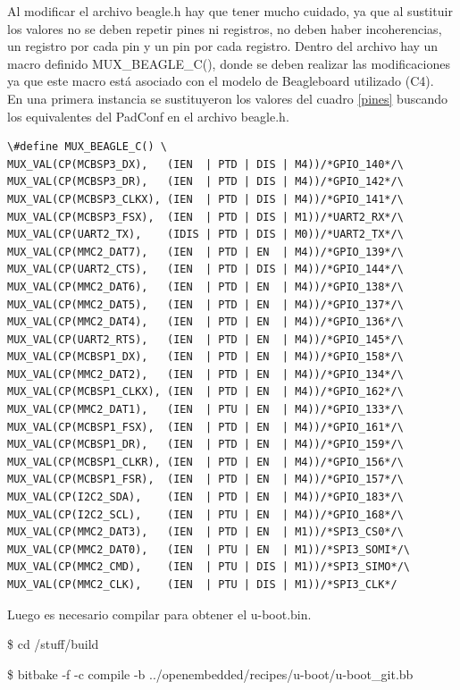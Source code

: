 Al modificar el archivo beagle.h hay que tener mucho cuidado, ya que al sustituir los valores no se deben repetir pines ni registros, no deben haber incoherencias, un registro por cada pin y un pin por cada registro. 
Dentro del archivo hay un macro definido MUX\_BEAGLE\_C(), donde se deben realizar las modificaciones ya que este macro está asociado con el modelo de Beagleboard utilizado (C4).\\
En una primera instancia se sustituyeron los valores del cuadro \ref{pines} buscando los equivalentes del 
PadConf en el archivo beagle.h. 


\begin{verbatim}
\#define MUX_BEAGLE_C() \
MUX_VAL(CP(MCBSP3_DX),   (IEN  | PTD | DIS | M4))/*GPIO_140*/\
MUX_VAL(CP(MCBSP3_DR),   (IEN  | PTD | DIS | M4))/*GPIO_142*/\
MUX_VAL(CP(MCBSP3_CLKX), (IEN  | PTD | DIS | M4))/*GPIO_141*/\
MUX_VAL(CP(MCBSP3_FSX),  (IEN  | PTD | DIS | M1))/*UART2_RX*/\
MUX_VAL(CP(UART2_TX),    (IDIS | PTD | DIS | M0))/*UART2_TX*/\
MUX_VAL(CP(MMC2_DAT7),   (IEN  | PTD | EN  | M4))/*GPIO_139*/\
MUX_VAL(CP(UART2_CTS),   (IEN  | PTD | DIS | M4))/*GPIO_144*/\
MUX_VAL(CP(MMC2_DAT6),   (IEN  | PTD | EN  | M4))/*GPIO_138*/\
MUX_VAL(CP(MMC2_DAT5),   (IEN  | PTD | EN  | M4))/*GPIO_137*/\
MUX_VAL(CP(MMC2_DAT4),   (IEN  | PTD | EN  | M4))/*GPIO_136*/\
MUX_VAL(CP(UART2_RTS),   (IEN  | PTD | EN  | M4))/*GPIO_145*/\
MUX_VAL(CP(MCBSP1_DX),   (IEN  | PTD | EN  | M4))/*GPIO_158*/\
MUX_VAL(CP(MMC2_DAT2),   (IEN  | PTD | EN  | M4))/*GPIO_134*/\
MUX_VAL(CP(MCBSP1_CLKX), (IEN  | PTD | EN  | M4))/*GPIO_162*/\
MUX_VAL(CP(MMC2_DAT1),   (IEN  | PTU | EN  | M4))/*GPIO_133*/\
MUX_VAL(CP(MCBSP1_FSX),  (IEN  | PTD | EN  | M4))/*GPIO_161*/\
MUX_VAL(CP(MCBSP1_DR),   (IEN  | PTD | EN  | M4))/*GPIO_159*/\
MUX_VAL(CP(MCBSP1_CLKR), (IEN  | PTD | EN  | M4))/*GPIO_156*/\
MUX_VAL(CP(MCBSP1_FSR),  (IEN  | PTD | EN  | M4))/*GPIO_157*/\
MUX_VAL(CP(I2C2_SDA),    (IEN  | PTD | EN  | M4))/*GPIO_183*/\
MUX_VAL(CP(I2C2_SCL),    (IEN  | PTU | EN  | M4))/*GPIO_168*/\
MUX_VAL(CP(MMC2_DAT3),   (IEN  | PTD | EN  | M1))/*SPI3_CS0*/\
MUX_VAL(CP(MMC2_DAT0),   (IEN  | PTU | EN  | M1))/*SPI3_SOMI*/\
MUX_VAL(CP(MMC2_CMD),    (IEN  | PTU | DIS | M1))/*SPI3_SIMO*/\
MUX_VAL(CP(MMC2_CLK),    (IEN  | PTU | DIS | M1))/*SPI3_CLK*/
\end{verbatim}

Luego es necesario compilar para obtener el u-boot.bin.

\bigskip
\centerline{\$ cd /stuff/build}

\centerline{\$ bitbake -f -c compile -b ../openembedded/recipes/u-boot/u-boot\_git.bb}

